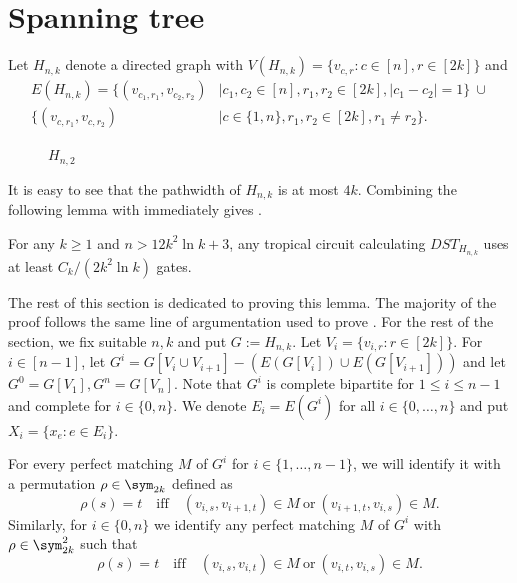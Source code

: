 \section{Spanning tree}
\label{sec:st}

Let $H_{n, k}$ denote a directed graph with $V(H_{n,k}) = \{v_{c,r} : c \in [n], r \in [2k]\}$ and
\begin{align*}
    E(H_{n, k}) = \{(v_{c_1, r_1}, v_{c_2, r_2}) &\mid
    c_1, c_2 \in [n], r_1, r_2 \in [2k], |c_1 - c_2| = 1 \} \ \cup \\
    \{(v_{c, r_1}, v_{c, r_2}) &\mid
    c \in \{1, n\}, r_1, r_2 \in [2k], r_1 \neq r_2 \}.
\end{align*}

\begin{figure}[h]
    \centering
    \label{fig:dst}
    
    \caption{$H_{n,2}$}
\end{figure}

It is easy to see that the pathwidth of $H_{n, k}$ is at most $4k$. Combining the following lemma with  immediately gives .

\begin{lemma}\label{lem:tc_dst}
    For any $k \geq 1$ and $n > 12k^2 \ln k + 3$, any tropical circuit calculating $DST_{H_{n, k}}$ uses at least
    $C_k / (2k^2 \ln k)$
    gates.
\end{lemma}

The rest of this section is dedicated to proving this lemma. The majority of the proof follows the same line of argumentation used to prove .
For the rest of the section, we fix suitable $n, k$ and put $G := H_{n, k}$. Let $V_i = \{v_{i, r} : r \in [2k]\}$. For $i \in [n - 1]$, let $G^i = G[V_i \cup V_{i + 1}] - (E(G[V_i]) \cup E(G[V_{i+1}]))$ and let $G^0 = G[V_1], G^n = G[V_n]$. Note that $G^i$ is complete bipartite for $1 \leq i \leq n - 1$ and complete for $i \in \{0, n\}$. We denote $E_i = E(G^i)$ for all $i \in \{0, \dots, n\}$ and put $X_i = \{x_e \colon e \in E_i\}$.

For every perfect matching $M$ of $G^i$ for $i \in \{1, \dots, n-1\}$, we will identify it with a permutation $\rho \in \sym_{2k}$ defined as
    $$
        \rho(s) = t \quad \text{iff} \quad (v_{i, s}, v_{i + 1, t}) \in M \ \text{or}\ (v_{i+1, t}, v_{i,s}) \in M.
    $$
    Similarly, for $i \in \{0, n\}$ we identify any perfect matching $M$ of $G^i$ with $\rho \in \sym_{2k}^2$ such that
    $$
        \rho(s) = t \quad \text{iff} \quad (v_{i, s}, v_{i, t}) \in M \ \text{or}\ (v_{i, t}, v_{i, s}) \in M.
    $$
    
